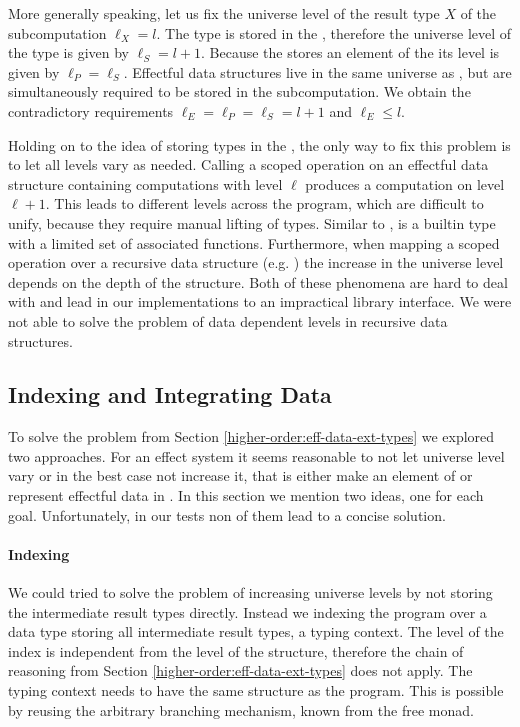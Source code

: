 More generally speaking, let us fix the universe level of the result type $X$ of
the subcomputation $\ell_X = l$.
The type is stored in the , therefore the universe level of the
 type is given by $\ell_S = l + 1$.
Because the  stores an element of the  its
level is given by $\ell_P = \ell_S$.
Effectful data structures live in the same universe as , but
are simultaneously required to be stored in the subcomputation.
We obtain the contradictory requirements $\ell_E = \ell_P = \ell_S = l + 1$ and
$\ell_E  \leqslant l$.

Holding on to the idea of storing types in the , the only way to
fix this problem is to let all levels vary as needed.
Calling a scoped operation on an effectful data structure containing
computations with level $\ell$ produces a computation on level $\ell + 1$.
This leads to different levels across the program, which are difficult to unify,
because they require manual lifting of types.
Similar to ,  is a builtin type with a
limited set of associated functions.
Furthermore, when mapping a scoped operation over a recursive data structure
(e.g. ) the increase in the universe level depends on the
depth of the structure.
Both of these phenomena are hard to deal with and lead in our implementations to
an impractical library interface.
We were not able to solve the problem of data dependent levels in recursive data
structures.


\subsection{Indexing and Integrating Data}
\label{higher-order:fixes}

To solve the problem from Section \ref{higher-order:eff-data-ext-types} we
explored two approaches.
For an effect system it seems reasonable to not let universe level vary or in
the best case not increase it, that is either make  an
element of  or represent effectful data in .
In this section we mention two ideas, one for each goal.
Unfortunately, in our tests non of them lead to a concise solution.

\paragraph{Indexing}
We could tried to solve the problem of increasing universe levels by not storing
the intermediate result types directly.
Instead we indexing the program over a data type storing all intermediate result
types, a typing context.
The level of the index is independent from the level of the structure, therefore
the chain of reasoning from Section \ref{higher-order:eff-data-ext-types} does
not apply.
The typing context needs to have the same structure as the program.
This is possible by reusing the arbitrary branching mechanism, known from the
free monad.

